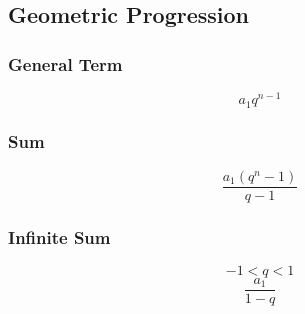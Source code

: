 \subsection{Geometric Progression}
\subsubsection{General Term}
$$ a_{1} q^{n - 1} $$
\subsubsection{Sum}
$$ \dfrac{a_{1} (q^{n} - 1)}{q - 1} $$
\subsubsection{Infinite Sum}
$$ -1 < q < 1 $$
$$ \dfrac{a_{1}}{1 - q} $$